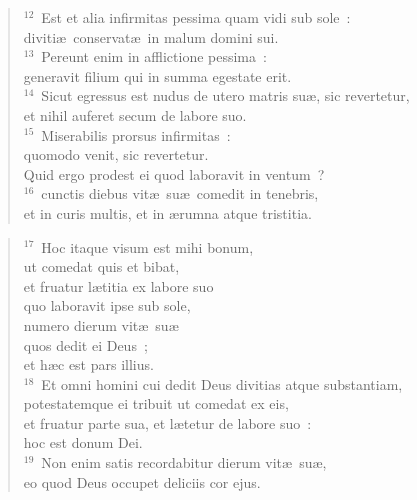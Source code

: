 \begin{verse}${}^{12}$~Est et alia infirmitas pessima quam vidi sub sole~:\\ diviti\ae\ conservat\ae\ in malum domini sui.\\
${}^{13}$~Pereunt enim in afflictione pessima~:\\ generavit filium qui in summa egestate erit.\\
${}^{14}$~Sicut egressus est nudus de utero matris su\ae , sic revertetur,\\ et nihil auferet secum de labore suo.\\
${}^{15}$~Miserabilis prorsus infirmitas~:\\ quomodo venit, sic revertetur.\\ Quid ergo prodest ei quod laboravit in ventum~?\\
${}^{16}$~cunctis diebus vit\ae\ su\ae\ comedit in tenebris,\\ et in curis multis, et in \ae rumna atque tristitia.\end{verse}


\begin{verse}${}^{17}$~Hoc itaque visum est mihi bonum,\\ ut comedat quis et bibat,\\ et fruatur l\ae titia ex labore suo\\ quo laboravit ipse sub sole,\\ numero dierum vit\ae\ su\ae \\ quos dedit ei Deus~;\\ et h\ae c est pars illius.\\
${}^{18}$~Et omni homini cui dedit Deus divitias atque substantiam,\\ potestatemque ei tribuit ut comedat ex eis,\\ et fruatur parte sua, et l\ae tetur de labore suo~:\\ hoc est donum Dei.\\
${}^{19}$~Non enim satis recordabitur dierum vit\ae\ su\ae ,\\ eo quod Deus occupet deliciis cor ejus.\end{verse}


